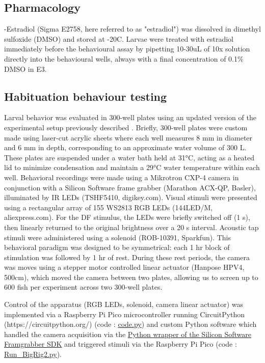 \documentclass[9pt,lineno]{RandlettLab_elife}
\begin{document}
\subsection{Pharmacology}

\textbeta-Estradiol (Sigma E2758, here referred to as "estradiol") was dissolved in dimethyl sulfoxide (DMSO) and stored at -20\degree C. 
Larvae were treated with estradiol immediately before the behavioural assay by pipetting 10-30uL of 10x solution directly into the behavioural wells, always with a final concentration of 0.1\% DMSO in E3.

\subsection{Habituation behaviour testing}

Larval behavior was evaluated in 300-well plates using an updated version of the experimental setup previously described \citep{Randlett2019-fj,Lamire2023-he}. 
Briefly, 300-well plates were custom made using laser-cut acrylic sheets where each well measures 8 mm in diameter and 6 mm in depth, corresponding to an approximate water volume of 300 \textmu L.
These plates are suspended under a water bath held at 31°C, acting as a heated lid to minimize condensation and maintain a 29°C water temperature within each well. 
Behavioral recordings were made using a Mikrotron CXP-4 camera in conjunction with a Silicon Software frame grabber (Marathon ACX-QP, Basler), illuminated by IR LEDs (TSHF5410, digikey.com). Visual stimuli were presented using a rectangular array of 155 WS2813 RGB LEDs (144LED/M, aliexpress.com). 
For the DF stimulus, the LEDs were briefly switched off (1 s), then linearly returned to the original brightness over a 20 s interval. 
Acoustic tap stimuli were administered using a solenoid (ROB-10391, Sparkfun). 
This behavioral paradigm was designed to be symmetrical: each 1 hr block of stimulation was followed by 1 hr of rest. 
During these rest periods, the camera was moves using a stepper motor controlled linear actuator (Hanpose HPV4, 500cm), which moved the camera between two plates, allowing us to screen up to 600 fish per experiment across two 300-well plates. 

Control of the apparatus (RGB LEDs, solenoid, camera linear actuator) was implemented via a Raspberry Pi Pico microcontroller running  CircuitPython (https://circuitpython.org/) (code : \href{https://github.com/owenrandlett/2025_HabEstrogen/tree/main/code/RigControl/PiPicro}{code.py}) and custom Python software which handled the camera acquisition via the \href{https://docs.baslerweb.com/frame-grabbers/python-wrapper}{Python wrapper of the Silicon Software Framgrabber SDK} and triggered stimuli via the Raspberry Pi Pico (code : \href{https://github.com/owenrandlett/2025_HabEstrogen/blob/main/code/RigControl/Run_BigRig2.py}{Run\_BigRig2.py}). 
\end{document}
